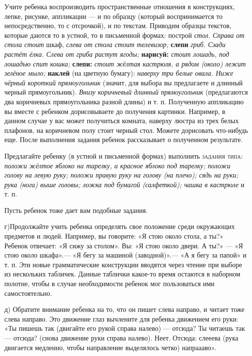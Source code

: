 \documentclass{book}
\renewcommand{\emph}[1]{\textit{#1}}
\begin{document}
Учите ребенка воспроизводить пространственные отношения в конструкциях,
лепке, рисунке, аппликации --- и по образцу (который воспринимается то
непосредственно, то с отсрочкой), и по текстам. Приводим образцы
текстов, которые даются то в устной, то в письменной формах: построй
\emph{стол. Справа от стола стоит} шкаф, \emph{слева от стола стоит
телевизор;} \textbf{слепи} \emph{гриб. Сзади растёт ёлка. Слева от гриба
растут ягоды;} \textbf{нарисуй:} \emph{стоит лошадь, под лошадью спит
кошка;} \textbf{слепи:} \emph{стоит жёлтая кастрюля, а рядом (около)
лежит зелёное мыло;} \textbf{наклей} (на цветную бумагу): \emph{наверху
три белые овала. Ниже чёрный короткий прямоугольник} (значит, для выбора
вы предлагаете и длинный черный прямоугольник). \emph{Внизу коричневый
длинный прямоугольник} (предлагаются два коричневых прямоугольника
разной длины) и т. п. Полученную аппликацию вы вместе с ребенком
дорисовываете до получения картинки. Например, в данном случае у вас
может получиться комната, наверху люстра из трех белых плафонов, на
коричневом полу стоит черный стол. Можете дорисовать что-нибудь еще.
После выполнения задания ребенок рассказывает о полученном результате.

Предлагайте ребенку (в устной и письменной формах) выполнить
\textsc{задания типа:} \emph{положи жёлтое яблоко на тарелку, а красное
яблоко под тарелку; положи голову на левую руку; положи правую руку на
голову (на плечо); сядь на руки; рука (нога) выше головы; ложка под
бумагой (салфеткой); чашка в кастрюле} и т. п.

Пусть ребенок тоже дает вам подобные задания.

г)Продолжайте учить ребенка определять свое положение среди окружающих
предметов и людей. Например, вы говорите: «Я стою около стола, а ты?»
Ребенок отвечает: «Я сижу за столом». Вы: «Я стою около двери. А ты?»
--- «Я стою около шкафа».--- «Я бегу за машиной (заводной)».--- «А я
бегу за папой» и т. п. Эти новые грамматические конструкции вводятся
через чтение при выборе из нескольких табличек. Данные таблички какое-то
время остаются в наборном полотне, чтобы в случае необходимости ребенок
мог пользоваться ими самостоятельно.

д) Обратите внимание ребенка на то, что он пишет слева направо, и читает
тоже слева направо. Это движение глаз вычлените для ребенка движением
его руки: «Ты пишешь так (двигайте его рукой справа налево) --- отсюда?
Ты читаешь так --- отсюда? (снова движение руки справа налево). Неет.
Отсюда: слееева (рука двигается медленно, чтобы направление выделялось
четко) напраааво».
\end{document}
